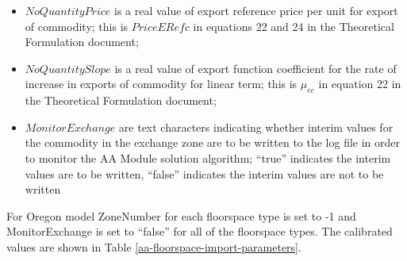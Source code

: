 \begin{itemize}
\item $NoQuantityPrice$ is a real value of export reference price per unit for export of commodity; this is $PriceERefc$ in equations 22 and 24 in the Theoretical Formulation document;
\item $NoQuantitySlope$ is a real value of export function coefficient for the rate of increase in exports of commodity for linear term; this is $\mu_{ec}$ in equation 22 in the Theoretical Formulation document;
\item $MonitorExchange$ are text characters indicating whether interim values for the commodity in the exchange zone are to be written to the log file in order to monitor the AA Module solution algorithm; ``true'' indicates the interim values are to be written, ``false'' indicates the interim values are not to be written
\end{itemize}
\noindent For Oregon model ZoneNumber for each floorspace type is set to -1 and MonitorExchange is set to ``false'' for all of the floorspace types. The calibrated values are shown in Table \ref{aa-floorspace-import-parameters}.

